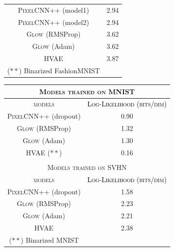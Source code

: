 {\begin{table}[tb]
\begin{subtable}{.5\textwidth}
\begin{tabular}{cc}
            \textsc{PixelCNN++} (model1)  & 2.94  \\
            \textsc{PixelCNN++} (model2)  & 2.94 \\
            \textsc{Glow} (RMSProp)   & 3.62 \\
            \textsc{Glow} (Adam)  & 3.62  \\
            \textsc{HVAE}  & 3.87 \\
            \bottomrule
            ($**$) Binarized FashionMNIST
        \end{tabular}
    \end{subtable}
    \begin{subtable}{.5\textwidth}
        \centering
        \scriptsize
        \begin{tabular}{cc}
            \toprule
            \multicolumn{2}{c}{\textsc{Models trained on MNIST}}\\
            \midrule
            \textsc{models}  & \textcolor{black}{\textsc{Log-Likelihood (bits/dim)}}\\
            \midrule
            \textsc{PixelCNN++} (dropout) & 0.90 \\
            \textsc{Glow} (RMSProp)  &  1.32 \\
            \textsc{Glow} (Adam)   & 1.30 \\
            \textsc{HVAE} ($**$)   &  0.16\\
            \bottomrule
            &   \\
            \toprule
            \multicolumn{2}{c}{\textsc{Models trained on SVHN}}\\
            \midrule
            \textsc{models}  & \textcolor{black}{\textsc{Log-Likelihood (bits/dim)}}\\
            \midrule
            \textsc{PixelCNN++} (dropout)  & 1.58 \\
            \textsc{Glow} (RMSProp)   & 2.23 \\
            \textsc{Glow} (Adam)  & 2.21  \\
            \textsc{HVAE}  & 2.38 \\
            \bottomrule
            ($**$) Binarized MNIST
        \end{tabular}
        
    \end{subtable} 
    \label{tab_modelagnostic:log_like}
\end{table}


}

